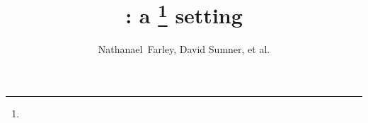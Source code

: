 



\title{: a \gurps\thanks{} setting}
\author{Nathanael~Farley, David Sumner, et al.}

\renewcommand{\maketitlehookb}{\vspace*{2em}\centering\textsc{\HUGE A Player's Guide}\vspace*{3em}}
\maketitle

\tableofcontents





